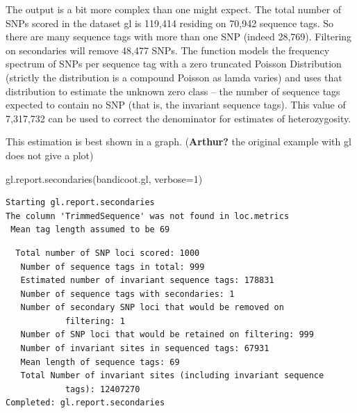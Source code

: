 \documentclass[
  letterpaper,
  DIV=11,
  numbers=noendperiod]{scrreprt}
\newenvironment{Shaded}{\begin{snugshade}}{\end{snugshade}}
\newcommand{\AttributeTok}[1]{\textcolor[rgb]{0.49,0.56,0.16}{#1}}
\newcommand{\DecValTok}[1]{\textcolor[rgb]{0.25,0.63,0.44}{#1}}
\newcommand{\FunctionTok}[1]{\textcolor[rgb]{0.02,0.16,0.49}{#1}}
\newcommand{\NormalTok}[1]{\textcolor[rgb]{0.00,0.44,0.13}{#1}}
\let\textttOrig\texttt
\renewcommand{\texttt}[1]{\textttOrig{\color{blue}{#1}}}
\begin{document}
The output is a bit more complex than one might expect. The total number
of SNPs scored in the dataset gl is 119,414 residing on 70,942 sequence
tags. So there are many sequence tags with more than one SNP (indeed
28,769). Filtering on secondaries will remove 48,477 SNPs. The function
models the frequency spectrum of SNPs per sequence tag with a zero
truncated Poisson Distribution (strictly the distribution is a compound
Poisson as lamda varies) and uses that distribution to estimate the
unknown zero class -- the number of sequence tags expected to contain no
SNP (that is, the invariant sequence tags). This value of 7,317,732 can
be used to correct the denominator for estimates of heterozygosity.

This estimation is best shown in a graph. (\textbf{Arthur?} the original
example with gl does not give a plot)

\begin{Shaded}
\begin{Highlighting}[]
\FunctionTok{gl.report.secondaries}\NormalTok{(bandicoot.gl, }\AttributeTok{verbose=}\DecValTok{1}\NormalTok{)}
\end{Highlighting}
\end{Shaded}

\begin{verbatim}
Starting gl.report.secondaries 
The column 'TrimmedSequence' was not found in loc.metrics
 Mean tag length assumed to be 69 
\end{verbatim}

\begin{figure}[H]

{\centering \texttt{[image: basicfiltering\_files/figure-pdf/unnamed-chunk-9-1.pdf]}

}

\end{figure}

\begin{verbatim}
  Total number of SNP loci scored: 1000 
   Number of sequence tags in total: 999 
   Estimated number of invariant sequence tags: 178831 
   Number of sequence tags with secondaries: 1 
   Number of secondary SNP loci that would be removed on 
            filtering: 1 
   Number of SNP loci that would be retained on filtering: 999 
   Number of invariant sites in sequenced tags: 67931 
   Mean length of sequence tags: 69 
   Total Number of invariant sites (including invariant sequence 
            tags): 12407270 
Completed: gl.report.secondaries 
\end{verbatim}
\end{document}
